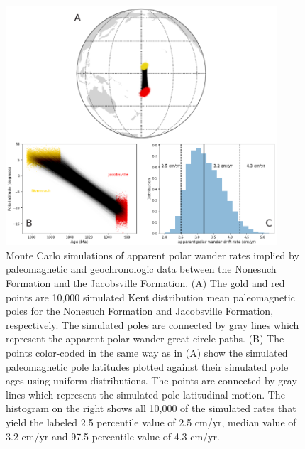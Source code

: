 \begin{figure}
\centering
\includegraphics[width=0.9\textwidth]{figure/Zhang2024a/SI_Jacobsville_Nonesuch_rate.pdf}
\caption{Monte Carlo simulations of apparent polar wander rates implied by paleomagnetic and geochronologic data between the Nonesuch Formation and the Jacobsville Formation. (A) The gold and red points are 10,000 simulated Kent distribution mean paleomagnetic poles for the Nonesuch Formation and Jacobsville Formation, respectively. The simulated poles are connected by gray lines which represent the apparent polar wander great circle paths. (B) The points color-coded in the same way as in (A) show the simulated paleomagnetic pole latitudes plotted against their simulated pole ages using uniform distributions. The points are connected by gray lines which represent the simulated pole latitudinal motion. The histogram on the right shows all 10,000 of the simulated rates that yield the labeled 2.5 percentile value of 2.5 cm/yr, median value of 3.2 cm/yr and 97.5 percentile value of 4.3 cm/yr.}
\label{fig:Jacobsville_Nonesuch_rate}
\end{figure}

